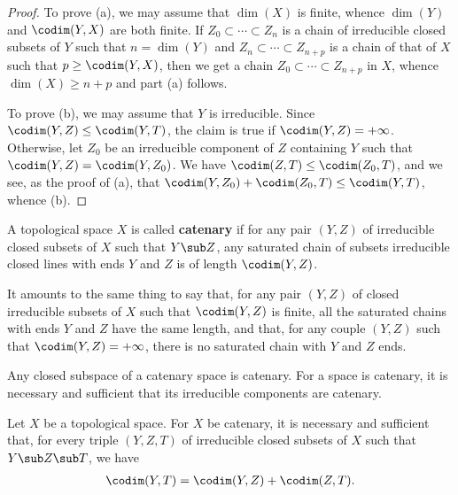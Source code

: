 \begin{proof}
To prove (a), we may assume that $\dim(X)$ is finite, whence $\dim(Y)$ and $\codim(Y,X)$ are both finite. If $Z_0\subset\cdots\subset Z_n$ is a chain of irreducible closed subsets of $Y$ such that $n=\dim(Y)$ and $Z_n\subset\cdots\subset Z_{n+p}$ is a chain of that of $X$ such that $p\geq\codim(Y,X)$, then we get a chain $Z_0\subset\cdots\subset Z_{n+p}$ in $X$, whence $\dim(X)\geq n+p$ and part (a) follows.\par
To prove (b), we may assume that $Y$ is irreducible. Since $\codim(Y,Z)\leq\codim(Y,T)$, the claim is true if $\codim(Y,Z)=+\infty$. Otherwise, let $Z_0$ be an irreducible component of $Z$ containing $Y$ such that $\codim(Y,Z)=\codim(Y,Z_0)$. We have $\codim(Z,T)\leq\codim(Z_0,T)$, and we see, as the proof of (a), that $\codim(Y,Z_0)+\codim(Z_0,T)\leq\codim(Y,T)$, whence (b).
\end{proof}
\begin{definition}
A topological space $X$ is called \textbf{catenary} if for any pair $(Y,Z)$ of irreducible closed subsets of $X$ such that $Y\sub Z$, any saturated chain of subsets irreducible closed lines with ends $Y$ and $Z$ is of length $\codim(Y,Z)$.
\end{definition}
It amounts to the same thing to say that, for any pair $(Y,Z)$ of closed irreducible subsets of $X$ such that $\codim(Y,Z)$ is finite, all the saturated chains with ends $Y$ and $Z$ have the same length, and that, for any couple $(Y,Z)$ such that $\codim(Y,Z)=+\infty$, there is no saturated chain with $Y$ and $Z$ ends.\par
Any closed subspace of a catenary space is catenary. For a space is catenary, it is necessary and sufficient that its irreducible components are catenary.
\begin{proposition}\label{topo space catenary iff}
Let $X$ be a topological space. For $X$ be catenary, it is necessary and sufficient that, for every triple $(Y,Z,T)$ of irreducible closed subsets of $X$ such that $Y\sub Z\sub T$, we have
\begin{align}\label{topo space catenary iff-1}
\codim(Y,T)=\codim(Y,Z)+\codim(Z,T).
\end{align}
\end{proposition}
